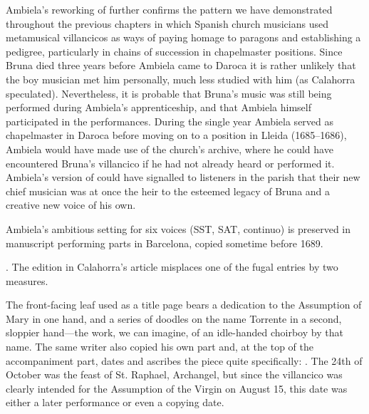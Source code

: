 Ambiela's reworking of  further confirms the pattern we
have demonstrated throughout the previous chapters in which Spanish church
musicians used metamusical villancicos as ways of paying homage to paragons and
establishing a pedigree, particularly in chains of succession in chapelmaster
positions.
Since Bruna died three years before Ambiela came to Daroca it is rather
unlikely that the boy musician met him personally, much less studied with him
(as Calahorra speculated).%
    \Autocite{Calahorra:Suban}
Nevertheless, it is probable that Bruna's music was still being performed
during Ambiela's apprenticeship, and that Ambiela himself participated in the
performances.  
During the single year Ambiela served as chapelmaster in Daroca before moving
on to a position in Lleida (1685--1686), Ambiela would have made use of the
church's archive, where he could have encountered Bruna's villancico if he had
not already heard or performed it.
Ambiela's version of  could have signalled to listeners
in the parish that their new chief musician was at once the heir to the
esteemed legacy of Bruna and a creative new voice of his own.

Ambiela's ambitious setting for six voices (SST, SAT, continuo) is preserved in
manuscript performing parts in Barcelona, copied sometime before 1689.%
\begin{Footnote}
    .
    The edition in Calahorra's article misplaces one of the fugal entries by
    two measures. 
\end{Footnote}
The front-facing leaf used as a title page bears a dedication to the Assumption
of Mary in one hand, and a series of doodles on the name Torrente in a second,
sloppier hand---the work, we can imagine, of an idle-handed choirboy by that
name.
The same writer also copied his own  part and, at the top of the
accompaniment part, dates and ascribes the piece quite specifically:
.
The 24th of October was the feast of St. Raphael, Archangel, but since the
villancico was clearly intended for the Assumption of the Virgin on August 15,
this date was either a later performance or even a copying date.

